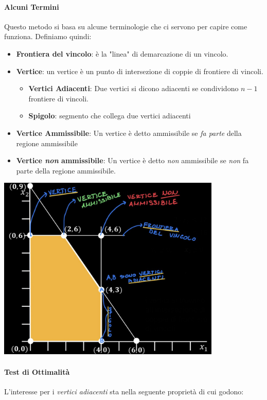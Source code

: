 \documentclass[12pt, a4paper, openany]{book}
\begin{document}
\paragraph*{Alcuni Termini}
Questo metodo si basa su alcune terminologie che ci servono per capire come funziona.
Definiamo quindi:
\begin{itemize}
    \item \textbf{Frontiera del vincolo}: è la "linea" di demarcazione di un vincolo.
    \item \textbf{Vertice}: un vertice è un punto di intersezione di coppie di frontiere di vincoli.
          \begin{itemize}
              \item \textbf{Vertici Adiacenti}: Due vertici si dicono adiacenti se condividono $n-1$ frontiere di vincoli.
              \item \textbf{Spigolo}: segmento che collega due vertici adiacenti
          \end{itemize}
    \item \textbf{Vertice Ammissibile}: Un vertice è detto ammissibile se \emph{fa parte} della regione ammissibile
    \item \textbf{Vertice \emph{non} ammissibile}: Un vertice è detto \emph{non} ammissibile se \emph{non} fa parte della regione ammissibile.
\end{itemize}
\begin{center}
    \includegraphics[width=0.8\textwidth]{img/Simplesso1.jpg}
\end{center}
\paragraph*{Test di Ottimalità}
L'interesse per i \emph{vertici adiacenti} sta nella seguente proprietà di cui godono:
\end{document}
